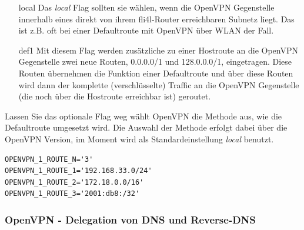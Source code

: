 \begin{description}
\begin{itemize}
\item [local] Das \emph{local} Flag sollten sie wählen, wenn die
              OpenVPN Gegenstelle innerhalb eines direkt von ihrem
              fli4l-Router erreichbaren Subnetz liegt. Das ist
              z.B. oft bei einer Defaultroute mit OpenVPN über WLAN
              der Fall.
\item [def1] Mit diesem Flag werden zusätzliche zu einer Hostroute an
             die OpenVPN Gegenstelle zwei neue Routen, 0.0.0.0/1 und
             128.0.0.0/1, eingetragen. Diese Routen übernehmen die
             Funktion einer Defaultroute und über diese Routen wird
             dann der komplette (verschlüsselte) Traffic an die
             OpenVPN Gegenstelle (die noch über die Hostroute
             erreichbar ist) geroutet.
\end{itemize}

  Lassen Sie das optionale Flag weg wählt OpenVPN die Methode aus, wie
  die Defaultroute umgesetzt wird. Die Auswahl der Methode erfolgt
  dabei über die OpenVPN Version, im Moment wird als
  Standardeinstellung \emph{local} benutzt.

\begin{example}
\begin{verbatim}
OPENVPN_1_ROUTE_N='3'
OPENVPN_1_ROUTE_1='192.168.33.0/24'
OPENVPN_1_ROUTE_2='172.18.0.0/16'
OPENVPN_1_ROUTE_3='2001:db8:/32'
\end{verbatim}
\end{example}

\end{description}

\subsubsection{OpenVPN - Delegation von DNS und Reverse-DNS}

